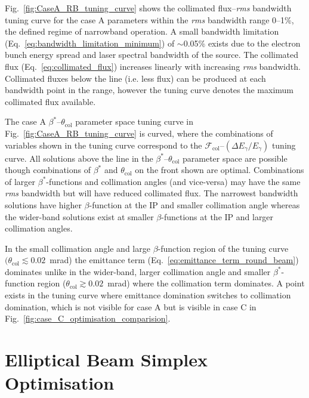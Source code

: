 \documentclass[../main.tex]{subfiles}
\begin{document}
Fig.~\ref{fig:CaseA_RB_tuning_curve} shows the collimated flux--\textit{rms} bandwidth tuning curve for the case A parameters within the \textit{rms} bandwidth range 0--1\%, the defined regime of narrowband operation. A small bandwidth limitation (Eq.~\ref{eq:bandwidth_limitation_minimum}) of $\sim$0.05\% exists due to the electron bunch energy spread and laser spectral bandwidth of the source. The collimated flux (Eq.~\ref{eq:collimated_flux}) increases linearly with increasing \textit{rms} bandwidth. Collimated fluxes below the line (i.e. less flux) can be produced at each bandwidth point in the range, however the tuning curve denotes the maximum collimated flux available. 

The case A $\beta^{*}$--$\theta_{\mathrm{col}}$ parameter space tuning curve in Fig.~\ref{fig:CaseA_RB_tuning_curve} is curved, where the combinations of variables shown in the tuning curve correspond to the $\mathcal{F}_{\mathrm{col}}$--$\left(\Delta E_{\gamma}/E_{\gamma}\right)$ tuning curve. All solutions above the line in the $\beta^{*}$--$\theta_{\mathrm{col}}$ parameter space are possible though combinations of $\beta^{*}$ and $\theta_{\mathrm{col}}$ on the front shown are optimal. Combinations of larger $\beta^{*}$-functions and collimation angles (and vice-versa) may have the same \textit{rms} bandwidth but will have reduced collimated flux. The narrowest bandwidth solutions have higher $\beta$-function at the IP and smaller collimation angle whereas the wider-band solutions exist at smaller $\beta$-functions at the IP and larger collimation angles. 

In the small collimation angle and large $\beta$-function region of the tuning curve $(\theta_{\mathrm{col}}\lesssim 0.02$~\si{\milli\radian}) the emittance term (Eq.~\ref{eq:emittance_term_round_beam}) dominates unlike in the wider-band, larger collimation angle and smaller $\beta^{*}$-function region ($\theta_\mathrm{col} \gtrsim 0.02$~\si{\milli\radian}) where the collimation term dominates. A point exists in the tuning curve where emittance domination switches to collimation domination, which is not visible for case A but is visible in case C in Fig.~\ref{fig:case_C_optimisation_comparision}. 

\section{Elliptical Beam Simplex Optimisation}
\label{sec:EB_optimisation}
\end{document}
